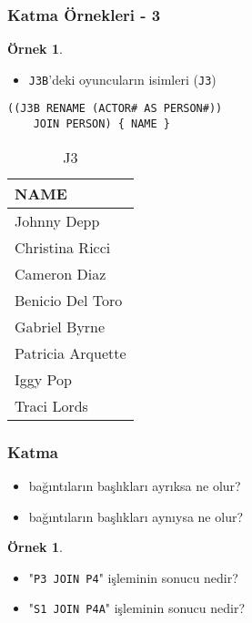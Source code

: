 \documentclass[dvipsnames]{beamer}
\theoremstyle{definition}
\theoremstyle{example}
\newtheorem{ornek}[theorem]{Örnek}
\theoremstyle{plain}
\begin{document}
\begin{frame}[fragile]
  \frametitle{Katma Örnekleri - 3}

  \begin{ornek}
    \begin{itemize}
      \item \texttt{J3B}'deki oyuncuların isimleri (\texttt{J3})
    \end{itemize}

    \begin{lstlisting}
((J3B RENAME (ACTOR# AS PERSON#))
    JOIN PERSON) { NAME }
    \end{lstlisting}

    \pause
    \vspace{-10pt}
    \begin{tiny}
    \begin{table}
      \caption{J3}
      \begin{tabular}{|l|}\hline
NAME             \\\hline\hline
Johnny Depp      \\\hline
Christina Ricci  \\\hline
Cameron Diaz     \\\hline
Benicio Del Toro \\\hline
Gabriel Byrne    \\\hline
Patricia Arquette\\\hline
Iggy Pop         \\\hline
Traci Lords      \\\hline
      \end{tabular}
    \end{table}
    \end{tiny}
  \end{ornek}
\end{frame}

\begin{frame}
  \frametitle{Katma}

  \begin{itemize}
    \item bağıntıların başlıkları ayrıksa ne olur?
    \item bağıntıların başlıkları aynıysa ne olur?
  \end{itemize}

  \pause
  \begin{ornek}
    \begin{itemize}
      \item "\lstinline!P3 JOIN P4!" işleminin sonucu nedir?
      \item "\lstinline!S1 JOIN P4A!" işleminin sonucu nedir?
    \end{itemize}
  \end{ornek}
\end{frame}
\end{document}
